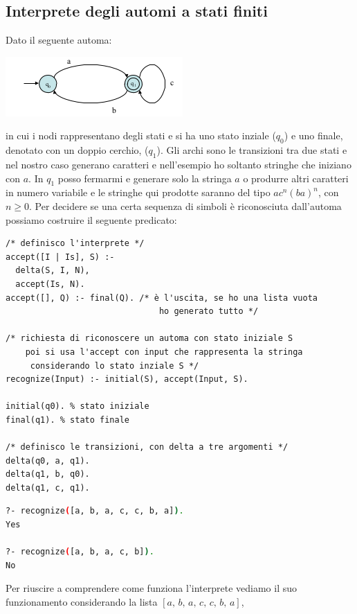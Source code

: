 \subsection{Interprete degli automi a stati finiti}
Dato il seguente automa:
\begin{center}
\includegraphics[scale=0.8]{img/aut.png}
\end{center}
in cui i nodi rappresentano degli stati e si ha uno stato inziale ($q_0$) e uno finale, denotato con un doppio cerchio, ($q_1$).\newline
Gli archi sono le transizioni tra due stati e nel nostro caso generano caratteri e nell'esempio ho soltanto stringhe che iniziano con $a$.\newline
In $q_1$ posso fermarmi e generare solo la stringa $a$ o produrre altri caratteri in numero variabile e le stringhe qui prodotte
saranno del tipo $ac^n(ba)^n$, con $n\geq 0$.\newline
Per decidere se una certa sequenza di simboli è riconosciuta dall’automa possiamo costruire il seguente predicato:
\begin{verbatim}
/* definisco l'interprete */
accept([I | Is], S) :-
  delta(S, I, N),
  accept(Is, N).
accept([], Q) :- final(Q). /* è l'uscita, se ho una lista vuota
                               ho generato tutto */

/* richiesta di riconoscere un automa con stato iniziale S
    poi si usa l'accept con input che rappresenta la stringa
     considerando lo stato inziale S */
recognize(Input) :- initial(S), accept(Input, S).

initial(q0). % stato iniziale
final(q1). % stato finale

/* definisco le transizioni, con delta a tre argomenti */
delta(q0, a, q1).
delta(q1, b, q0).
delta(q1, c, q1).
\end{verbatim}
\begin{shaded}
\begin{lstlisting}[language=bash]
?- recognize([a, b, a, c, c, b, a]).
Yes

?- recognize([a, b, a, c, b]).
No
\end{lstlisting}
\end{shaded}
Per riuscire a comprendere come funziona l'interprete vediamo il suo funzionamento considerando la lista $[a,\,b,\,a,\,c,\,c,\,b,\,a]$,
